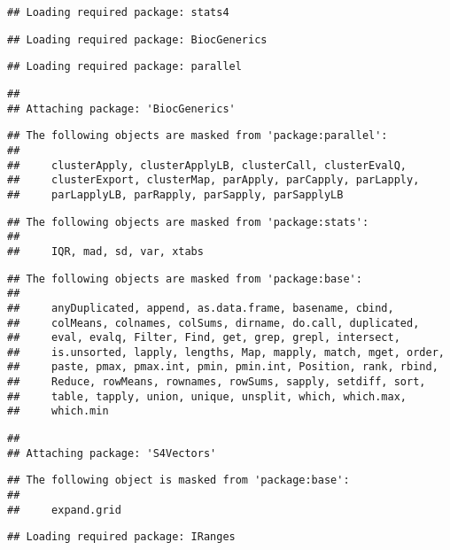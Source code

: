 \documentclass[]{article}
\begin{document}
\begin{verbatim}
## Loading required package: stats4
\end{verbatim}

\begin{verbatim}
## Loading required package: BiocGenerics
\end{verbatim}

\begin{verbatim}
## Loading required package: parallel
\end{verbatim}

\begin{verbatim}
## 
## Attaching package: 'BiocGenerics'
\end{verbatim}

\begin{verbatim}
## The following objects are masked from 'package:parallel':
## 
##     clusterApply, clusterApplyLB, clusterCall, clusterEvalQ,
##     clusterExport, clusterMap, parApply, parCapply, parLapply,
##     parLapplyLB, parRapply, parSapply, parSapplyLB
\end{verbatim}

\begin{verbatim}
## The following objects are masked from 'package:stats':
## 
##     IQR, mad, sd, var, xtabs
\end{verbatim}

\begin{verbatim}
## The following objects are masked from 'package:base':
## 
##     anyDuplicated, append, as.data.frame, basename, cbind,
##     colMeans, colnames, colSums, dirname, do.call, duplicated,
##     eval, evalq, Filter, Find, get, grep, grepl, intersect,
##     is.unsorted, lapply, lengths, Map, mapply, match, mget, order,
##     paste, pmax, pmax.int, pmin, pmin.int, Position, rank, rbind,
##     Reduce, rowMeans, rownames, rowSums, sapply, setdiff, sort,
##     table, tapply, union, unique, unsplit, which, which.max,
##     which.min
\end{verbatim}

\begin{verbatim}
## 
## Attaching package: 'S4Vectors'
\end{verbatim}

\begin{verbatim}
## The following object is masked from 'package:base':
## 
##     expand.grid
\end{verbatim}

\begin{verbatim}
## Loading required package: IRanges
\end{verbatim}
\end{document}
